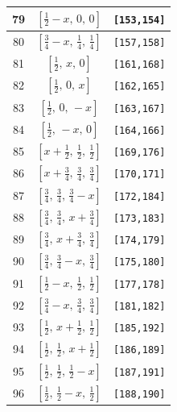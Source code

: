 \documentclass[fleqn,8pt]{jsarticle}
\begin{document}
\begin{longtable}{ccc}
79 & $\left[ \frac{1}{2} - x,\, 0,\, 0 \right]$ & {\tt [153,154]} \\ \hline
80 & $\left[ \frac{3}{4} - x,\, \frac{1}{4},\, \frac{1}{4} \right]$ & {\tt [157,158]} \\ \hline
81 & $\left[ \frac{1}{2},\, x,\, 0 \right]$ & {\tt [161,168]} \\ \hline
82 & $\left[ \frac{1}{2},\, 0,\, x \right]$ & {\tt [162,165]} \\ \hline
83 & $\left[ \frac{1}{2},\, 0,\, - x \right]$ & {\tt [163,167]} \\ \hline
84 & $\left[ \frac{1}{2},\, - x,\, 0 \right]$ & {\tt [164,166]} \\ \hline
85 & $\left[ x + \frac{1}{2},\, \frac{1}{2},\, \frac{1}{2} \right]$ & {\tt [169,176]} \\ \hline
86 & $\left[ x + \frac{3}{4},\, \frac{3}{4},\, \frac{3}{4} \right]$ & {\tt [170,171]} \\ \hline
87 & $\left[ \frac{3}{4},\, \frac{3}{4},\, \frac{3}{4} - x \right]$ & {\tt [172,184]} \\ \hline
88 & $\left[ \frac{3}{4},\, \frac{3}{4},\, x + \frac{3}{4} \right]$ & {\tt [173,183]} \\ \hline
89 & $\left[ \frac{3}{4},\, x + \frac{3}{4},\, \frac{3}{4} \right]$ & {\tt [174,179]} \\ \hline
90 & $\left[ \frac{3}{4},\, \frac{3}{4} - x,\, \frac{3}{4} \right]$ & {\tt [175,180]} \\ \hline
91 & $\left[ \frac{1}{2} - x,\, \frac{1}{2},\, \frac{1}{2} \right]$ & {\tt [177,178]} \\ \hline
92 & $\left[ \frac{3}{4} - x,\, \frac{3}{4},\, \frac{3}{4} \right]$ & {\tt [181,182]} \\ \hline
93 & $\left[ \frac{1}{2},\, x + \frac{1}{2},\, \frac{1}{2} \right]$ & {\tt [185,192]} \\ \hline
94 & $\left[ \frac{1}{2},\, \frac{1}{2},\, x + \frac{1}{2} \right]$ & {\tt [186,189]} \\ \hline
95 & $\left[ \frac{1}{2},\, \frac{1}{2},\, \frac{1}{2} - x \right]$ & {\tt [187,191]} \\ \hline
96 & $\left[ \frac{1}{2},\, \frac{1}{2} - x,\, \frac{1}{2} \right]$ & {\tt [188,190]} \\
\end{longtable}
\renewcommand{\arraystretch}{1.2}
\end{document}
